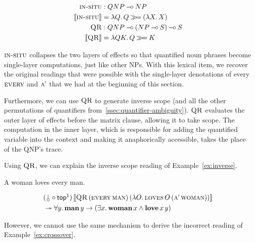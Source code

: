 \begin{align*}
  \textsc{in-situ} &: QNP \mathbin{{-}\mkern-3.5mu{\circ}} NP \\
  \llbracket \textsc{in-situ} \rrbracket &= \lambda Q.\, Q \mathbin{\gg\!=} (\lambda X.\, X) \\
  \textsc{QR} &: QNP \mathbin{{-}\mkern-3.5mu{\circ}} (NP \mathbin{{-}\mkern-3.5mu{\circ}} S) \mathbin{{-}\mkern-3.5mu{\circ}} S \\
  \llbracket \textsc{QR} \rrbracket &= \lambda Q K.\, Q \mathbin{\gg\!=} K
\end{align*}

$\textsc{in-situ}$ collapses the two layers of effects so that quantified noun
phrases become single-layer computations, just like other NPs. With this
lexical item, we recover the original readings that were possible with the
single-layer denotations of every $\textsc{every}$ and $\textsc{a'}$ that we had
at the beginning of this section.

Furthermore, we can use $\textsc{QR}$ to generate inverse scope (and all the
other permutations of quantifiers
from~\ref{ssec:quantifier-ambiguity}). $\textsc{QR}$ evaluates the outer layer
of effects before the matrix clause, allowing it to take scope. The
computation in the inner layer, which is responsible for adding the
quantified variable into the context and making it anaphorically
accessible, takes the place of the QNP's trace.

Using $\textsc{QR}$, we can explain the inverse scope reading of
Example~\ref{ex:inverse}.

\begin{exe}
  \ex A woman loves every man. \label{ex:inverse}
\end{exe}

\begin{align*}
  &\ap{(\cherry \circ \TOP\footnotemark)}{\sem{\app{\abs{QR}}{(\ap{\abs{every}}{\abs{man}})}{(\lam{O}{\app{\abs{loves}}{O}{(\ap{\abs{a'}}{\abs{woman}})}})}}} \\
  &\tto \forall y.\, \ap{\obj{man}}{y} \to (\exists x.\, \ap{\obj{woman}}{x} \land \app{\obj{love}}{x}{y})
\end{align*}


However, we cannot use the same mechanism to derive the incorrect reading
of Example~\ref{ex:crossover}.

